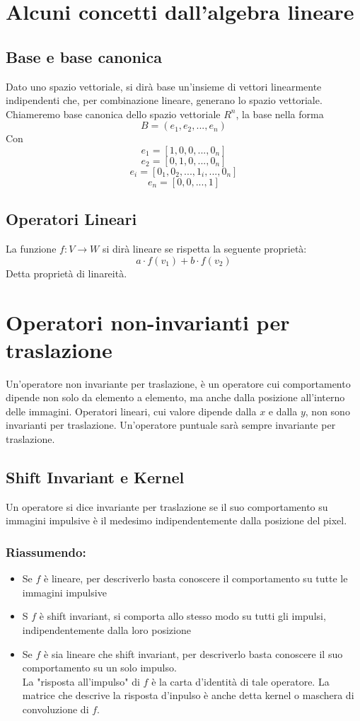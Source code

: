 \documentclass{report}
\begin{document}
	\section{Alcuni concetti dall'algebra lineare}
	\subsection{Base e base canonica}
	Dato uno spazio vettoriale, si dirà base un'insieme di vettori linearmente indipendenti che, per combinazione lineare, generano lo spazio vettoriale.
	Chiameremo base canonica dello spazio vettoriale $R^n$, la base nella forma
	$$
	B = (e_1,e_2,...,e_n)
	$$
	Con
	$$
	e_1 = [1,0,0,...,0_n]
	$$
	$$
	e_2 = [0,1,0,...,0_n]
	$$
	$$
	e_i = [0_1, 0_2, ... , 1_i, ... , 0_n]
	$$
	$$
	e_n = [0,0,..., 1]
	$$
	\subsection{Operatori Lineari}
	La funzione 
	$f:V \rightarrow W$ 
	si dirà lineare se rispetta la seguente proprietà:
	$$
	a\cdot f(v_1) + b\cdot f(v_2)
	$$
	Detta proprietà di linareità.
	
	\section{Operatori non-invarianti per traslazione}
	Un'operatore non invariante per traslazione, è un operatore cui comportamento dipende non solo da elemento a elemento, ma anche dalla posizione all'interno delle immagini.
	Operatori lineari, cui valore dipende dalla $x$ e dalla $y$, non sono invarianti per traslazione.
	Un'operatore puntuale sarà sempre invariante per traslazione.
	\subsection{Shift Invariant e Kernel}
	Un operatore si dice invariante per traslazione se il suo comportamento su immagini impulsive è il medesimo indipendentemente dalla posizione del pixel.
	\subsubsection{Riassumendo:}
	\begin{itemize}
		\item Se $f$ è lineare, per descriverlo basta conoscere il comportamento su tutte le immagini impulsive
		\item S $f$ è shift invariant, si comporta allo stesso modo su tutti gli impulsi, indipendentemente dalla loro posizione
		\item Se $f$ è sia lineare che shift invariant, per descriverlo basta conoscere il suo comportamento su un solo impulso.\\
		      La "risposta all'impulso" di $f$ è la carta d'identità di tale operatore. La matrice che descrive la risposta d'inpulso è anche detta kernel o maschera di convoluzione di $f$.
	\end{itemize}
\end{document}
